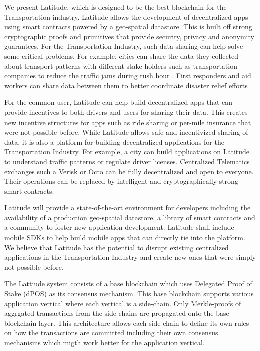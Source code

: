 We present Latitude, which is designed to be the best blockchain for the Transportation industry. Latitude allows the
development of decentralized apps using smart contracts powered by a geo-spatial datastore. This is built off strong
cryptographic proofs and primitives that provide security, privacy and anonymity guarantees.  For the Transportation
Industry, such data sharing can help solve some critical problems.  For example, cities can share the data they
collected about transport patterns with different stake holders such as transportation companies to reduce the traffic
jams during rush hour \cite{traffic_jam}. First responders and aid workers can share data between them to better coordinate
disaster relief efforts \cite{bharosa_2010}.

For the common user, Latitude can help build decentralized apps that can provide incentives to both drivers and users
for sharing their data. This creates new incentive structures for apps such as ride sharing or per-mile insurance that
were not possible before. While Latitude allows safe and incentivized sharing of data, it is also a platform for
building decentralized applications for the Transportation Industry. For example, a city can build applications on
Latitude to understand traffic patterns or regulate driver licenses. Centralized Telematics exchanges such a Verisk or
Octo can be fully decentralized and open to everyone. Their operations can be replaced by intelligent and
cryptographically strong smart contracts.

Latitude will provide a state-of-the-art environment for developers including the availability of a production
geo-spatial datastore, a library of smart contracts and a community to foster new application development. Latitude
shall include mobile SDKs to help build mobile apps that can directly tie into the platform. We believe that Latitude
has the potential to disrupt existing centralized applications in the Transportation Industry and create new ones that
were simply not possible before.

The Lattiude system consists of a base blockchain which uses Delegated Proof of Stake (dPOS) as its consensus
mechanism. This base blockchain supports various application vertical where each vertical is a side-chain. Only
Merkle-proofs of aggrgated transactions from the side-chains are propagated onto the base blockchain layer. This
architecture allows each side-chain to define its own rules on how the transactions are committed including their own
consensus mechanisms which migth work better for the application vertical.

